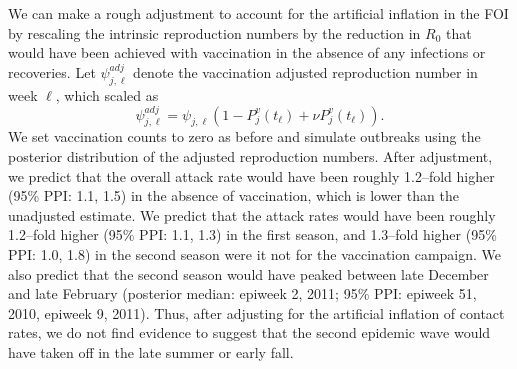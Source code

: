 We can make a rough adjustment to account for the artificial inflation in the FOI by rescaling the intrinsic reproduction numbers by the reduction in $ R_0 $ that would have been achieved with vaccination in the absence of any infections or recoveries. Let $ \psi_{j,\ell}^{adj} $ denote the vaccination adjusted reproduction number in week $ \ell $, which scaled as
$$\psi_{j,\ell}^{adj} = \psi_{j,\ell}\left (1 - P^v_j(t_\ell) + \nu P^v_j(t_\ell)\right ).$$
We set vaccination counts to zero as before and simulate outbreaks using the posterior distribution of the adjusted reproduction numbers. After adjustment, we predict that the overall attack rate would have been roughly 1.2--fold higher (95\% PPI: 1.1, 1.5) in the absence of vaccination, which is lower than the unadjusted estimate. We predict that the attack rates would have been roughly 1.2--fold higher (95\% PPI: 1.1, 1.3) in the first season, and 1.3--fold higher (95\% PPI: 1.0, 1.8) in the second season were it not for the vaccination campaign. We also predict that the second season would have peaked between late December and late February (posterior median: epiweek 2, 2011; 95\% PPI: epiweek 51, 2010, epiweek 9, 2011). Thus, after adjusting for the artificial inflation of contact rates, we do not find evidence to suggest that the second epidemic wave would have taken off in the late summer or early fall. 
 
